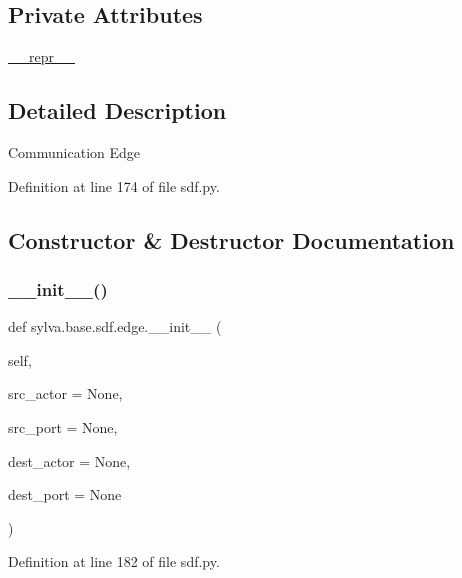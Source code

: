 \subsection*{Private Attributes}
\begin{DoxyCompactItemize}
\item 
\hyperlink{classsylva_1_1base_1_1sdf_1_1edge_a03f8f78d19556dff84516cb339a98013}{\+\_\+\+\_\+repr\+\_\+\+\_\+}
\end{DoxyCompactItemize}


\subsection{Detailed Description}
\begin{DoxyVerb}  Communication Edge
\end{DoxyVerb}
 

Definition at line 174 of file sdf.\+py.



\subsection{Constructor \& Destructor Documentation}
\mbox{\label{classsylva_1_1base_1_1sdf_1_1edge_a6a95fa703d840fda3211f4b254958611}} 
\subsubsection{\texorpdfstring{\+\_\+\+\_\+init\+\_\+\+\_\+()}{\_\_init\_\_()}}
{\footnotesize\ttfamily def sylva.\+base.\+sdf.\+edge.\+\_\+\+\_\+init\+\_\+\+\_\+ (\begin{DoxyParamCaption}\item[{}]{self,  }\item[{}]{src\+\_\+actor = {\ttfamily None},  }\item[{}]{src\+\_\+port = {\ttfamily None},  }\item[{}]{dest\+\_\+actor = {\ttfamily None},  }\item[{}]{dest\+\_\+port = {\ttfamily None} }\end{DoxyParamCaption})}



Definition at line 182 of file sdf.\+py.


